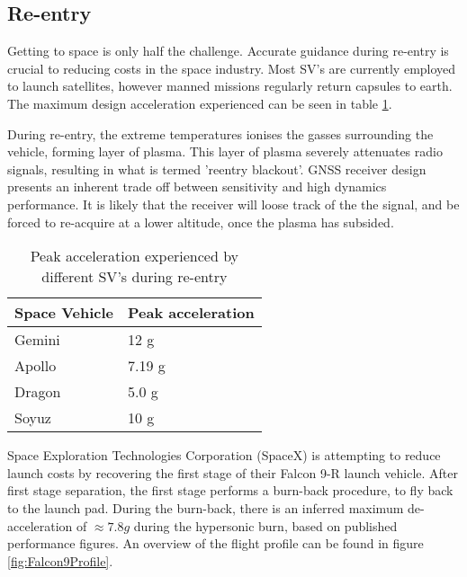 \subsection{Re-entry}
Getting to space is only half the challenge. Accurate guidance during re-entry is crucial to reducing costs in the space industry. Most \ac{SV}'s are currently employed to launch satellites, however manned missions regularly return capsules to earth. The maximum design acceleration experienced can be seen in table \ref{ReEntryTable}. 

During re-entry, the extreme temperatures ionises the gasses surrounding the vehicle, forming  layer of plasma. This layer of plasma severely attenuates radio signals, resulting in what is termed 'reentry blackout'. GNSS receiver design presents an inherent trade off between sensitivity and high dynamics performance. It is likely that the receiver will loose track of the the signal, and be forced to re-acquire at a lower altitude, once the plasma has subsided. 


\begin{table}[!htb]
\centering
\begin{tabular}{|l|l|}
\hline
\rowcolor[HTML]{C0C0C0} 
Space Vehicle & Peak acceleration                    \\ \hline
Gemini        & 12 g \cite{FAA}                      \\ \hline
\rowcolor[HTML]{EFEFEF} 
Apollo        & 7.19 g \cite{johnston1975biomedical} \\ \hline
Dragon        & 5.0 g \cite{trevino2008spacex}       \\ \hline
\rowcolor[HTML]{EFEFEF} 
Soyuz         & 10 g \cite{ReentryDynamics}          \\ \hline
\end{tabular}
\caption{Peak acceleration experienced by different \ac{SV}'s during re-entry}
\label{ReEntryTable}
\end{table}



Space Exploration Technologies Corporation (SpaceX) is attempting to reduce launch costs by recovering the first stage of their Falcon 9-R launch vehicle. After first stage separation, the first stage performs a burn-back procedure, to fly back to the launch pad. During the burn-back, there is an inferred maximum de-acceleration of $\approx 7.8 g$ during the hypersonic burn, based on published performance figures. An overview of the flight profile can be found in figure \ref{fig:Falcon9Profile}.

